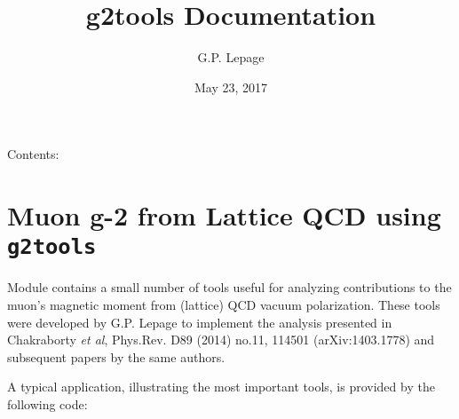 \documentclass[letterpaper,10pt,english]{sphinxmanual}
\title{g2tools Documentation}
\date{May 23, 2017}
\author{G.P. Lepage}
\begin{document}
\maketitle
\tableofcontents
{}\label{index::doc}


Contents:


\chapter{Muon g-2 from Lattice QCD using \texttt{g2tools}}
\label{overview:g2tools-documentation}\label{overview:muon-g-2-from-lattice-qcd-using-g2tools}\label{overview::doc}
Module {\hyperref[g2tools:module-g2tools]{\emph{}}} contains a small number of tools useful for analyzing
contributions to the muon's magnetic moment from (lattice) QCD vacuum
polarization. These tools were developed by G.P. Lepage to implement the
analysis presented in Chakraborty \emph{et al}, Phys.Rev. D89 (2014) no.11, 114501
(arXiv:1403.1778) and subsequent papers by the same authors.

A typical application, illustrating the most important tools, is
provided by the following code:
\end{document}
